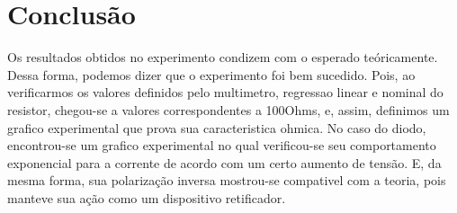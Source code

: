 \section{Conclusão}
    Os resultados obtidos no experimento condizem com o esperado teóricamente. Dessa forma, podemos dizer que o experimento 
foi bem sucedido. Pois, ao verificarmos os valores definidos pelo multimetro, regressao linear e nominal do resistor, chegou-se
a valores correspondentes a 100Ohms, e, assim, definimos um grafico experimental que prova sua caracteristica ohmica.
No caso do diodo, encontrou-se um grafico experimental no qual verificou-se seu comportamento exponencial para a corrente
de acordo com um certo aumento de tensão. E, da mesma forma, sua polarização inversa mostrou-se compativel com a teoria, pois
manteve sua ação como um dispositivo retificador.